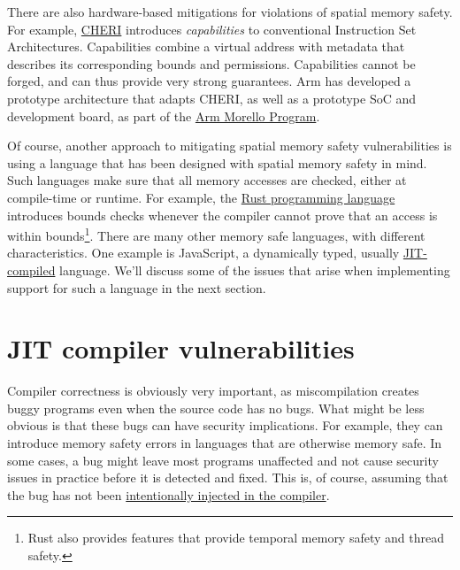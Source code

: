 \documentclass[
  a4paper,
]{report}
\begin{document}
There are also hardware-based mitigations for violations of spatial
memory safety. For example,
\href{https://www.cl.cam.ac.uk/research/security/ctsrd/cheri/}{CHERI}
introduces
\emph{\label{__index_entry_88}{capabilities}}
to conventional Instruction Set Architectures. Capabilities combine a
virtual address with metadata that describes its corresponding bounds
and permissions. Capabilities cannot be forged, and can thus provide
very strong guarantees. Arm has developed a prototype architecture that
adapts CHERI, as well as a prototype SoC and development board, as part
of the \href{https://www.arm.com/architecture/cpu/morello}{Arm Morello
Program}.

Of course, another approach to mitigating spatial memory safety
vulnerabilities is using a language that has been designed with spatial
memory safety in mind. Such languages make sure that all memory accesses
are checked, either at compile-time or runtime. For example, the
\href{https://www.rust-lang.org/}{Rust programming language} introduces
bounds checks whenever the compiler cannot prove that an access is
within bounds\footnote{Rust also provides features that provide temporal
  memory safety and thread safety.}. There are many other memory safe
languages, with different characteristics. One example is JavaScript, a
dynamically typed, usually
\hyperref[jit-compiler-vulnerabilities]{JIT-compiled} language. We'll
discuss some of the issues that arise when implementing support for such
a language in the next section.

\section{JIT compiler
vulnerabilities}\label{sec:jit-compiler-vulnerabilities}

Compiler correctness is obviously very important, as miscompilation
creates buggy programs even when the source code has no bugs. What might
be less obvious is that these bugs can have security implications. For
example, they can introduce memory safety errors in languages that are
otherwise memory safe. In some cases, a bug might leave most programs
unaffected and not cause security issues in practice before it is
detected and fixed. This is, of course, assuming that the bug has not
been \hyperref[supply-chain-attacks]{intentionally injected in the
compiler}.
\end{document}
